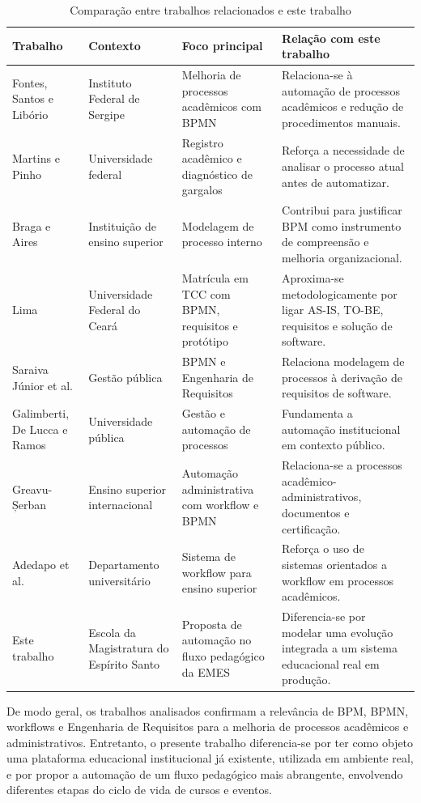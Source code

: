 \begin{table}[H]
\centering
\caption{Comparação entre trabalhos relacionados e este trabalho}
\label{tab:comparacao-trabalhos-relacionados}
\begin{tabular}{p{3.2cm} p{3.1cm} p{3.2cm} p{3.9cm}}
\hline
\textbf{Trabalho} & \textbf{Contexto} & \textbf{Foco principal} & \textbf{Relação com este trabalho} \\
\hline
Fontes, Santos e Libório \cite{FontesSantosLiborio2020} & Instituto Federal de Sergipe & Melhoria de processos acadêmicos com BPMN & Relaciona-se à automação de processos acadêmicos e redução de procedimentos manuais. \\
\hline
Martins e Pinho \cite{MartinsPinho2021} & Universidade federal & Registro acadêmico e diagnóstico de gargalos & Reforça a necessidade de analisar o processo atual antes de automatizar. \\
\hline
Braga e Aires \cite{BragaAires2024} & Instituição de ensino superior & Modelagem de processo interno & Contribui para justificar BPM como instrumento de compreensão e melhoria organizacional. \\
\hline
Lima \cite{Lima2026} & Universidade Federal do Ceará & Matrícula em TCC com BPMN, requisitos e protótipo & Aproxima-se metodologicamente por ligar AS-IS, TO-BE, requisitos e solução de software. \\
\hline
Saraiva Júnior et al. \cite{SaraivaJuniorEtAl2025} & Gestão pública & BPMN e Engenharia de Requisitos & Relaciona modelagem de processos à derivação de requisitos de software. \\
\hline
Galimberti, De Lucca e Ramos \cite{GalimbertiLuccaRamos2024} & Universidade pública & Gestão e automação de processos & Fundamenta a automação institucional em contexto público. \\
\hline
Greavu-Șerban \cite{GreavuSerban2015} & Ensino superior internacional & Automação administrativa com workflow e BPMN & Relaciona-se a processos acadêmico-administrativos, documentos e certificação. \\
\hline
Adedapo et al. \cite{AdedapoEtAl2023} & Departamento universitário & Sistema de workflow para ensino superior & Reforça o uso de sistemas orientados a workflow em processos acadêmicos. \\
\hline
Este trabalho & Escola da Magistratura do Espírito Santo & Proposta de automação no fluxo pedagógico da EMES & Diferencia-se por modelar uma evolução integrada a um sistema educacional real em produção. \\
\hline
\end{tabular}
\end{table}

De modo geral, os trabalhos analisados confirmam a relevância de BPM, BPMN, workflows e Engenharia de Requisitos para a melhoria de processos acadêmicos e administrativos. Entretanto, o presente trabalho diferencia-se por ter como objeto uma plataforma educacional institucional já existente, utilizada em ambiente real, e por propor a automação de um fluxo pedagógico mais abrangente, envolvendo diferentes etapas do ciclo de vida de cursos e eventos.
